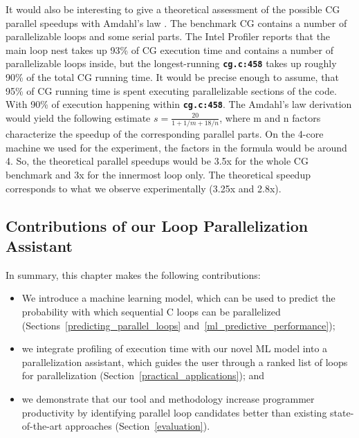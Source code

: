 It would also be interesting to give a theoretical assessment of the possible CG parallel speedups with Amdahl's law \cite{10.1145/1465482.1465560}. The benchmark CG contains a number of parallelizable loops and some serial parts. The Intel Profiler reports that the main loop nest takes up 93\% of CG execution time and contains a number of parallelizable loops inside, but the longest-running \textbf{\texttt{cg.c:458}} takes up roughly 90\% of the total CG running time. It would be precise enough to assume, that 95\% of CG running time is spent executing parallelizable sections of the code. With 90\% of execution happening within \textbf{\texttt{cg.c:458}}. The Amdahl's law derivation would yield the following estimate $s=\frac{20}{1+1/m+18/n}$, where m and n factors characterize the speedup of the corresponding parallel parts. On the 4-core machine we used for the experiment, the factors in the formula would be around 4. So, the theoretical parallel speedups would be 3.5x for the whole CG benchmark and 3x for the innermost loop only. The theoretical speedup corresponds to what we observe experimentally (3.25x and 2.8x).
\subsection{Contributions of our Loop Parallelization Assistant}
\quad In summary, this chapter makes the following contributions:
%
\begin{itemize}
\renewcommand\labelitemi{$\vartriangleright$}
\renewcommand\labelitemii{$\bullet$}
\item We introduce a machine learning model, which can be used to predict the probability with which sequential C loops can be parallelized (Sections~\ref{predicting_parallel_loops} and~\ref{ml_predictive_performance});
\item we integrate profiling of execution time with our novel ML model into a parallelization assistant, which guides the user through a ranked list of loops for parallelization (Section~\ref{practical_applications}); and
\item we demonstrate that our tool and methodology increase programmer productivity by identifying parallel loop candidates better than existing state-of-the-art approaches (Section~\ref{evaluation}).
\end{itemize}

